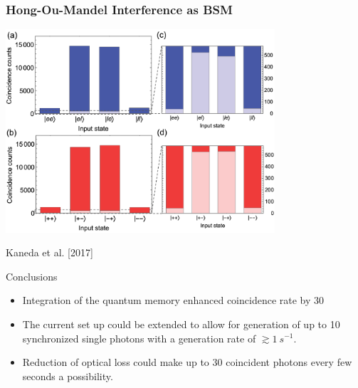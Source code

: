 \documentclass{beamer}
\begin{document}
\begin{frame}\frametitle{Hong-Ou-Mandel Interference as BSM}

    \begin{center}
    \includegraphics[width=0.75\textwidth]{Images/Figure4.jpg}

    \tiny{Kaneda et al. [2017]}
    \end{center}
\end{frame}


\begin{frame}{Conclusions}
    \begin{itemize}
        \item Integration of the quantum memory enhanced coincidence rate by $30$
        \item The current set up could be extended to allow for generation of up to 10 synchronized single photons 
            with a generation rate of $\gtrsim1\ s^{-1}$.
        \item Reduction of optical loss could make up to 30 coincident photons every few seconds a possibility.
    \end{itemize}
\end{frame}
\end{document}
